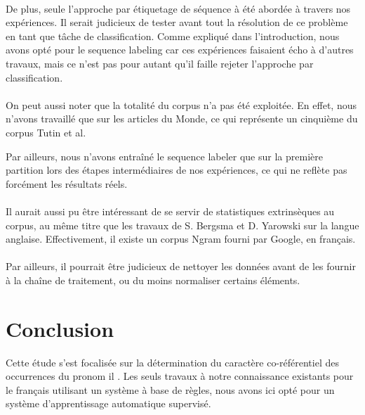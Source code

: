 \documentclass[a4paper,12pt]{article}
\begin{document}
\paragraph{}
De plus, seule l'approche par étiquetage de séquence à été abordée à travers nos expériences. Il serait judicieux de tester avant tout la résolution de ce problème en tant que tâche de classification. Comme expliqué dans l'introduction, nous avons opté pour le sequence labeling car ces expériences faisaient écho à d'autres travaux, mais ce n'est pas pour autant qu'il faille rejeter l'approche par classification.

\paragraph{}
On peut aussi noter que la totalité du corpus n'a pas été exploitée. En effet, nous n'avons travaillé que sur les articles du Monde, ce qui représente un cinquième du corpus Tutin et al.

Par ailleurs, nous n'avons entraîné le sequence labeler que sur la première partition lors des étapes intermédiaires de nos expériences, ce qui ne reflète pas forcément les résultats réels.

\paragraph{}
Il aurait aussi pu être intéressant de se servir de statistiques extrinsèques au corpus, au même titre que les travaux de S. Bergsma et D. Yarowski sur la langue anglaise. Effectivement, il existe un corpus Ngram fourni par Google, en français.

\paragraph{}
Par ailleurs, il pourrait être judicieux de nettoyer les données avant de les fournir à la chaîne de traitement, ou du moins normaliser certains éléments.


\section*{Conclusion}

Cette étude s'est focalisée sur la détermination du caractère co-référentiel des occurrences du pronom \og il \fg{}. Les seuls travaux à notre connaissance existants pour le français utilisant un système à base de règles, nous avons ici opté pour un système d'apprentissage automatique supervisé.
\end{document}
